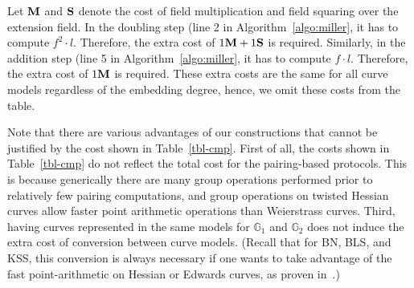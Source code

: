 Let $\textbf{M}$ and $\textbf{S}$ denote the cost of field multiplication and field squaring over the extension field.
In the doubling step (line 2 in Algorithm~\ref{algo:miller},
it has to compute $f^2 \cdot l$.
Therefore, the extra cost of $1\textbf{M} + 1\textbf{S}$ is required.
Similarly, in the addition step (line 5 in Algorithm~\ref{algo:miller},
it has to compute $f \cdot l$.
Therefore, the extra cost of $1\textbf{M}$ is required.
These extra costs are the same for all curve models regardless of the embedding degree, hence, we omit these costs from the table.

Note that there are various advantages of our constructions that cannot be justified by the cost shown in Table~\ref{tbl-cmp}.
First of all, the costs shown in Table~\ref{tbl-cmp} do not reflect the total cost for the pairing-based protocols.
This is because generically there are many group operations performed prior to relatively few pairing computations, and group operations on twisted Hessian curves allow faster point arithmetic operations than Weierstrass curves.
Third, having curves represented in the same models for $\mathbb{G}_1$ and $\mathbb{G}_2$ does not induce the extra cost of conversion between curve models. (Recall that for BN, BLS, and KSS, this conversion is always necessary if one wants to take advantage of the fast point-arithmetic on Hessian or Edwards curves, as proven in~\cite{2013/bos-pairing}.)


